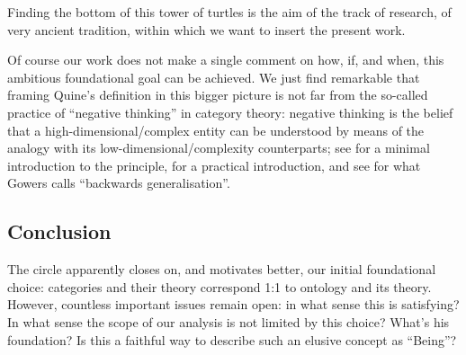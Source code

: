 Finding the bottom of this tower of turtles is the aim of the track of research, of very ancient tradition, within which we want to insert the present work.

Of course our work does not make a single comment on how, if, and when, this ambitious foundational goal can be achieved. We just find remarkable that framing Quine's definition in this bigger picture is not far from the so-called practice of ``negative thinking'' in category theory: negative thinking is the belief that a high-dimensional/complex entity can be understood by means of the analogy with its low-dimensional/complexity counterparts; see \cite{nlab:category-order,nlab:neg-think} for a minimal introduction to the principle, \cite{baez2010lectures} for a practical introduction, and see \cite{gowers2007} for what Gowers calls ``backwards generalisation''.



\subsection{Conclusion}
The circle apparently closes on, and motivates better, our initial foundational choice: categories and their theory correspond 1:1 to ontology and its theory. However, countless important issues remain open: in what sense this is satisfying? In what sense the scope of our analysis is not limited by this choice? What's his foundation? Is this a faithful way to describe such an elusive concept as ``Being''?

